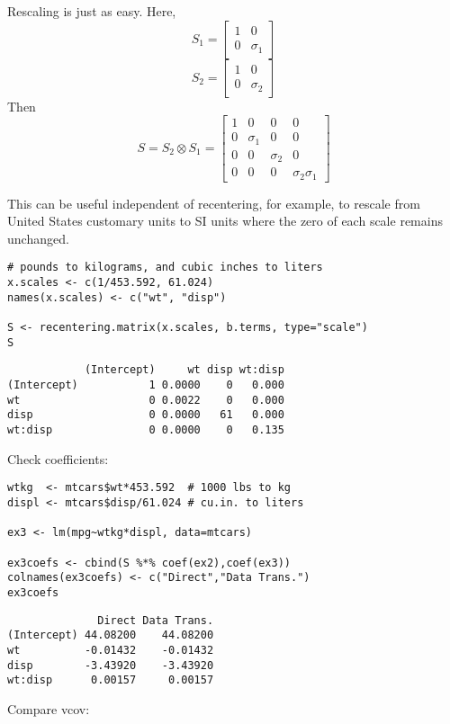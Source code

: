 \documentclass[]{article}
\begin{document}
Rescaling is just as easy. Here,
\[S_1=\begin{bmatrix}1 &0 \\ 0 &\sigma_1 \end{bmatrix}\]
\[S_2=\begin{bmatrix}1 &0 \\ 0 &\sigma_2 \end{bmatrix}\] Then
\[S = S_2 \otimes S_1 = \begin{bmatrix} 1 &0 &0 &0 \\
  0 &\sigma_1 &0 &0 \\ 0 &0 &\sigma_2 &0 \\ 0 &0 &0 &\sigma_2\sigma_1 \end{bmatrix}\]

This can be useful independent of recentering, for example, to rescale
from United States customary units to SI units where the zero of each
scale remains unchanged.

\begin{verbatim}
# pounds to kilograms, and cubic inches to liters
x.scales <- c(1/453.592, 61.024)
names(x.scales) <- c("wt", "disp")
  
S <- recentering.matrix(x.scales, b.terms, type="scale")
S
\end{verbatim}

\begin{verbatim}
            (Intercept)     wt disp wt:disp
(Intercept)           1 0.0000    0   0.000
wt                    0 0.0022    0   0.000
disp                  0 0.0000   61   0.000
wt:disp               0 0.0000    0   0.135
\end{verbatim}

Check coefficients:

\begin{verbatim}
wtkg  <- mtcars$wt*453.592  # 1000 lbs to kg
displ <- mtcars$disp/61.024 # cu.in. to liters

ex3 <- lm(mpg~wtkg*displ, data=mtcars)

ex3coefs <- cbind(S %*% coef(ex2),coef(ex3))
colnames(ex3coefs) <- c("Direct","Data Trans.")
ex3coefs
\end{verbatim}

\begin{verbatim}
              Direct Data Trans.
(Intercept) 44.08200    44.08200
wt          -0.01432    -0.01432
disp        -3.43920    -3.43920
wt:disp      0.00157     0.00157
\end{verbatim}

Compare vcov:
\end{document}
